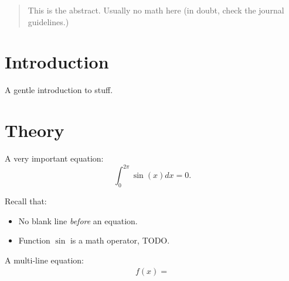 \documentclass{amsart}
\begin{document}
\begin{abstract}
  This is the abstract. Usually no math here (in doubt, check the journal
  guidelines.)
\end{abstract}

\section{Introduction}\label{sec:intro}

A gentle introduction to stuff.

\section{Theory}%
\label{sec:Theory}

A very important equation:
\[ \int_0^{2\pi} \sin(x) dx = 0. \]

Recall that:
\begin{itemize}
  \item No blank line \emph{before} an equation. 
  \item Function $\sin$ is a math operator, TODO.
\end{itemize}

A multi-line equation:
\begin{align}
  \label{eq:}
  f(x) = 
  
\end{align}
\end{document}
